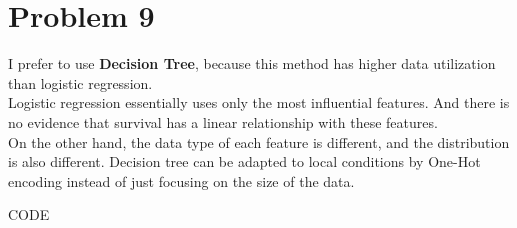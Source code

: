 \documentclass{article}
\begin{document}
\section*{Problem 9}
I prefer to use \textbf{Decision Tree}, because this method has higher data utilization than logistic regression.\\
Logistic regression essentially uses only the most influential features. And there is no evidence that survival has a linear relationship with these features.\\
On the other hand, the data type of each feature is different, and the distribution is also different. Decision tree can be adapted to local conditions by One-Hot encoding instead of just focusing on the size of the data.\\
\pagebreak
\appendix
\begin{center}
    CODE
    \label{sec:appendix}
\end{center}

\end{document}
